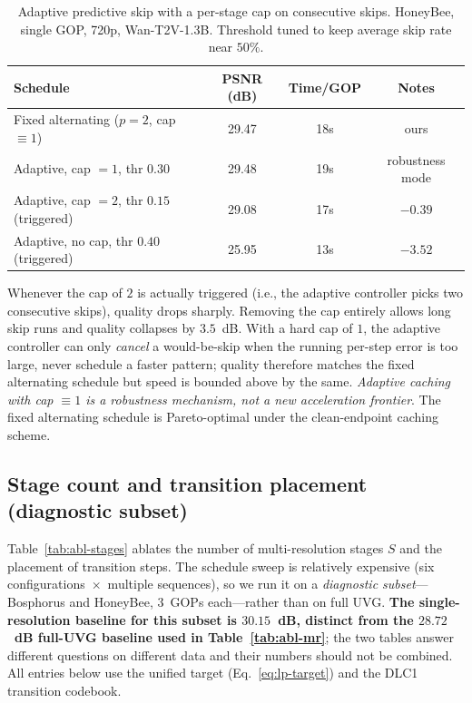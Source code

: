 \begin{table}[t]
\centering
\caption{Adaptive predictive skip with a per-stage cap on consecutive
skips. HoneyBee, single GOP, 720p, Wan-T2V-1.3B. Threshold tuned to
keep average skip rate near $50\%$.}
\label{tab:abl-cap}
\small
\begin{tabular}{@{}l c c c@{}}
\toprule
Schedule & PSNR (dB) & Time/GOP & Notes \\
\midrule
Fixed alternating ($p\!=\!2$, cap $\equiv 1$) & 29.47 & 18s & ours \\
Adaptive, cap $=\!1$, thr $0.30$               & 29.48 & 19s & robustness mode \\
Adaptive, cap $=\!2$, thr $0.15$ (triggered)   & 29.08 & 17s & $-0.39$ \\
Adaptive, no cap, thr $0.40$ (triggered)       & 25.95 & 13s & $-3.52$ \\
\bottomrule
\end{tabular}
\end{table}

Whenever the cap of $2$ is actually triggered (i.e., the adaptive
controller picks two consecutive skips), quality drops sharply. Removing
the cap entirely allows long skip runs and quality collapses by
$3.5$~dB. With a hard cap of $1$, the adaptive controller can only
\emph{cancel} a would-be-skip when the running per-step error is too
large, never schedule a faster pattern; quality therefore matches the
fixed alternating schedule but speed is bounded above by the same.
\emph{Adaptive caching with cap $\equiv 1$ is a robustness mechanism,
not a new acceleration frontier}. The fixed alternating schedule is
Pareto-optimal under the clean-endpoint caching scheme.

\subsection{Stage count and transition placement (diagnostic subset)}
\label{sec:abl-stages}

Table~\ref{tab:abl-stages} ablates the number of multi-resolution stages
$S$ and the placement of transition steps. The schedule sweep is
relatively expensive (six configurations~$\times$~multiple
sequences), so we run it on a \emph{diagnostic subset}---Bosphorus and
HoneyBee, $3$~GOPs each---rather than on full UVG. \textbf{The single-
resolution baseline for this subset is $30.15$~dB, distinct from the
$28.72$~dB full-UVG baseline used in Table~\ref{tab:abl-mr}}; the two
tables answer different questions on different data and their numbers
should not be combined. All entries below use the unified target
(Eq.~\ref{eq:lp-target}) and the DLC1 transition codebook.

